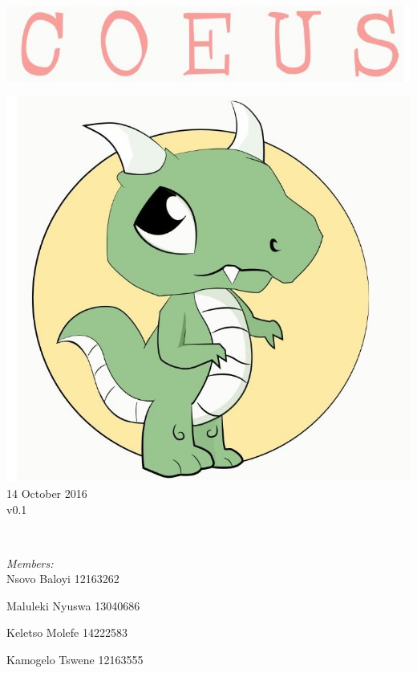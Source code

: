 \documentclass[a4paper,12pt]{article}
\begin{document}
\begin{titlepage}
	\includegraphics[width=\textwidth]{name} \\[1cm]
	\begin{minipage}{0.4\textwidth}
	\begin{flushleft} \large
	\includegraphics[width=\textwidth]{logo} \\[0.5cm]
	{\large 14 October 2016}\\
	{\large v0.1}
	\end{flushleft}
	\end{minipage}
	~
	\begin{minipage}{0.5\textwidth}
	\begin{flushright} \large
	\emph{Members:}\\%
	Nsovo Baloyi 12163262

	Maluleki Nyuswa 13040686
	
	Keletso Molefe 14222583
	
	Kamogelo Tswene 12163555

	\end{flushright}
	\end{minipage}\\[4cm]
\end{titlepage}
\end{document}
